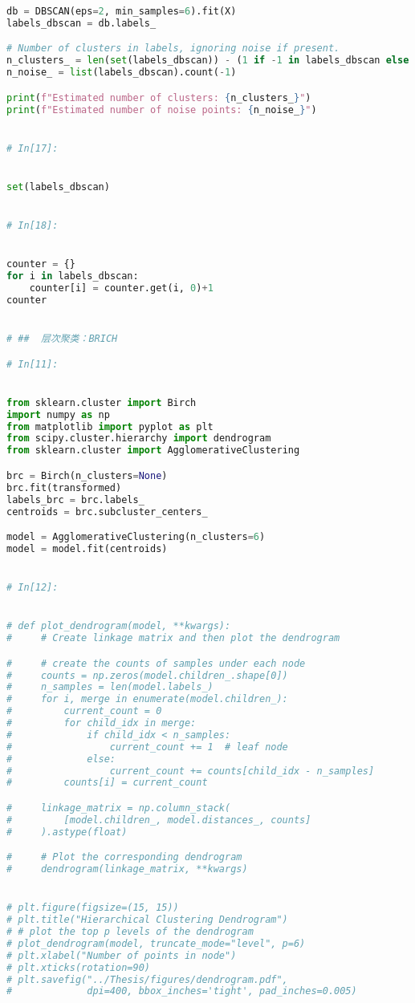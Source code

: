 \documentclass[withoutpreface,bwprint]{cumcmthesis}
\begin{document}
\begin{appendices}
\begin{lstlisting}[language=Python]
db = DBSCAN(eps=2, min_samples=6).fit(X)
labels_dbscan = db.labels_

# Number of clusters in labels, ignoring noise if present.
n_clusters_ = len(set(labels_dbscan)) - (1 if -1 in labels_dbscan else 0)
n_noise_ = list(labels_dbscan).count(-1)

print(f"Estimated number of clusters: {n_clusters_}")
print(f"Estimated number of noise points: {n_noise_}")


# In[17]:


set(labels_dbscan)


# In[18]:


counter = {}
for i in labels_dbscan:
    counter[i] = counter.get(i, 0)+1
counter


# ##  层次聚类：BRICH

# In[11]:


from sklearn.cluster import Birch
import numpy as np
from matplotlib import pyplot as plt
from scipy.cluster.hierarchy import dendrogram
from sklearn.cluster import AgglomerativeClustering

brc = Birch(n_clusters=None)
brc.fit(transformed)
labels_brc = brc.labels_
centroids = brc.subcluster_centers_

model = AgglomerativeClustering(n_clusters=6)
model = model.fit(centroids)


# In[12]:


# def plot_dendrogram(model, **kwargs):
#     # Create linkage matrix and then plot the dendrogram

#     # create the counts of samples under each node
#     counts = np.zeros(model.children_.shape[0])
#     n_samples = len(model.labels_)
#     for i, merge in enumerate(model.children_):
#         current_count = 0
#         for child_idx in merge:
#             if child_idx < n_samples:
#                 current_count += 1  # leaf node
#             else:
#                 current_count += counts[child_idx - n_samples]
#         counts[i] = current_count

#     linkage_matrix = np.column_stack(
#         [model.children_, model.distances_, counts]
#     ).astype(float)

#     # Plot the corresponding dendrogram
#     dendrogram(linkage_matrix, **kwargs)


# plt.figure(figsize=(15, 15))
# plt.title("Hierarchical Clustering Dendrogram")
# # plot the top p levels of the dendrogram
# plot_dendrogram(model, truncate_mode="level", p=6)
# plt.xlabel("Number of points in node")
# plt.xticks(rotation=90)
# plt.savefig("../Thesis/figures/dendrogram.pdf",
#             dpi=400, bbox_inches='tight', pad_inches=0.005)



\end{lstlisting}
\end{appendices}
\end{document}
